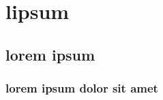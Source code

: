 \documentclass[a4paper,emptystyle]{bsuir-std}
\begin{document}





\section{lipsum}
\subsection{lorem ipsum}
\subsubsection{lorem ipsum dolor sit amet}
\lipsum[1]
\end{document}
